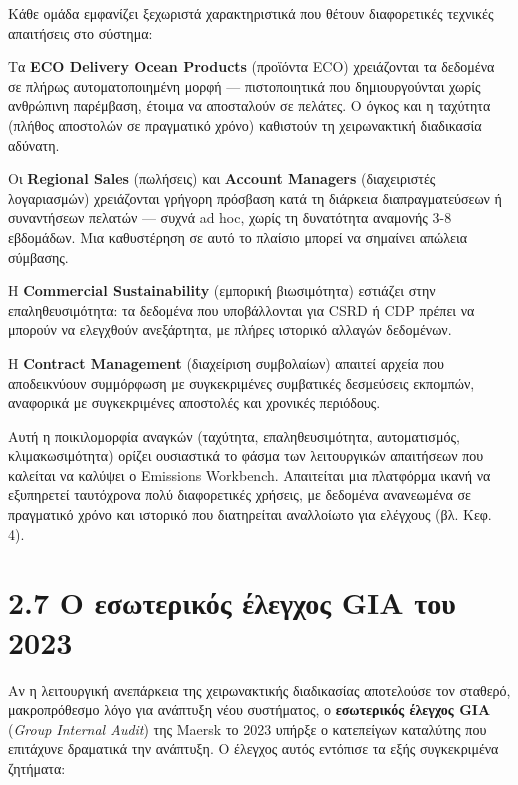 Κάθε ομάδα εμφανίζει ξεχωριστά χαρακτηριστικά που θέτουν διαφορετικές
τεχνικές απαιτήσεις στο σύστημα:

Τα \textbf{ECO Delivery Ocean Products} (προϊόντα ECO) χρειάζονται τα
δεδομένα σε πλήρως αυτοματοποιημένη μορφή --- πιστοποιητικά που
δημιουργούνται χωρίς ανθρώπινη παρέμβαση, έτοιμα να αποσταλούν σε
πελάτες. Ο όγκος και η ταχύτητα (πλήθος αποστολών σε πραγματικό χρόνο)
καθιστούν τη χειρωνακτική διαδικασία αδύνατη.

Οι \textbf{Regional Sales} (πωλήσεις) και \textbf{Account Managers}
(διαχειριστές λογαριασμών) χρειάζονται γρήγορη πρόσβαση κατά τη διάρκεια
διαπραγματεύσεων ή συναντήσεων πελατών --- συχνά ad hoc, χωρίς τη
δυνατότητα αναμονής 3-8 εβδομάδων. Μια καθυστέρηση σε αυτό το πλαίσιο
μπορεί να σημαίνει απώλεια σύμβασης.

Η \textbf{Commercial Sustainability} (εμπορική βιωσιμότητα) εστιάζει
στην επαληθευσιμότητα: τα δεδομένα που υποβάλλονται για CSRD ή CDP
πρέπει να μπορούν να ελεγχθούν ανεξάρτητα, με πλήρες ιστορικό αλλαγών
δεδομένων.

Η \textbf{Contract Management} (διαχείριση συμβολαίων) απαιτεί αρχεία
που αποδεικνύουν συμμόρφωση με συγκεκριμένες συμβατικές δεσμεύσεις
εκπομπών, αναφορικά με συγκεκριμένες αποστολές και χρονικές περιόδους.

Αυτή η ποικιλομορφία αναγκών (ταχύτητα, επαληθευσιμότητα, αυτοματισμός,
κλιμακωσιμότητα) ορίζει ουσιαστικά το φάσμα των λειτουργικών απαιτήσεων
που καλείται να καλύψει ο Emissions Workbench. Απαιτείται μια πλατφόρμα
ικανή να εξυπηρετεί ταυτόχρονα πολύ διαφορετικές χρήσεις, με δεδομένα
ανανεωμένα σε πραγματικό χρόνο και ιστορικό που διατηρείται αναλλοίωτο
για ελέγχους (βλ. Κεφ. 4).

\section{2.7 Ο εσωτερικός έλεγχος GIA του
2023}\label{ux3bf-ux3b5ux3c3ux3c9ux3c4ux3b5ux3c1ux3b9ux3baux3ccux3c2-ux3adux3bbux3b5ux3b3ux3c7ux3bfux3c2-gia-ux3c4ux3bfux3c5-2023}

Αν η λειτουργική ανεπάρκεια της χειρωνακτικής διαδικασίας αποτελούσε τον
σταθερό, μακροπρόθεσμο λόγο για ανάπτυξη νέου συστήματος, ο
\textbf{εσωτερικός έλεγχος GIA} (\emph{Group Internal Audit}) της Maersk
το 2023 υπήρξε ο κατεπείγων καταλύτης που επιτάχυνε δραματικά την
ανάπτυξη. Ο έλεγχος αυτός εντόπισε τα εξής συγκεκριμένα ζητήματα:

